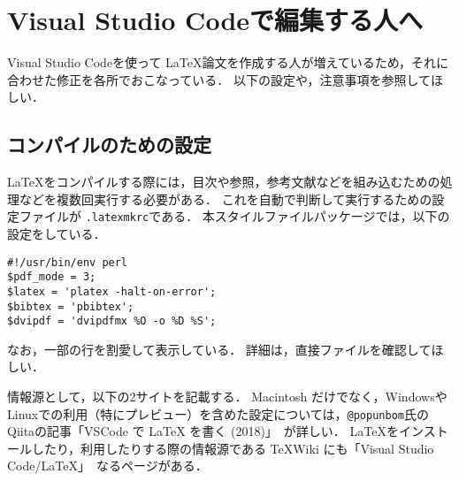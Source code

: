 \documentclass[a4paper,11pt,oneside,openany]{jsbook}
\begin{document}
\chapter{Visual Studio Codeで編集する人へ}
Visual Studio Codeを使って \LaTeX 論文を作成する人が増えているため，それに合わせた修正を各所でおこなっている．
以下の設定や，注意事項を参照してほしい．

\section{コンパイルのための設定}
\LaTeX をコンパイルする際には，目次や参照，参考文献などを組み込むための処理などを複数回実行する必要がある．
これを自動で判断して実行するための設定ファイルが \verb+.latexmkrc+である．
本スタイルファイルパッケージでは，以下の設定をしている．
\begin{screen}
{\small
\begin{verbatim}
#!/usr/bin/env perl
$pdf_mode = 3;
$latex = 'platex -halt-on-error';
$bibtex = 'pbibtex';
$dvipdf = 'dvipdfmx %O -o %D %S';
\end{verbatim}
}
\end{screen}

なお，一部の行を割愛して表示している．
詳細は，直接ファイルを確認してほしい．

情報源として，以下の2サイトを記載する．
Macintosh だけでなく，WindowsやLinuxでの利用（特にプレビュー）を含めた設定については，\verb+@popunbom+氏のQiitaの記事「VSCode で LaTeX を書く (2018)」~\cite{popunbom1}が詳しい．
LaTeXをインストールしたり，利用したりする際の情報源である \TeX Wiki にも「Visual Studio Code/LaTeX」~\cite{texwikivscode}なるページがある．
\end{document}
